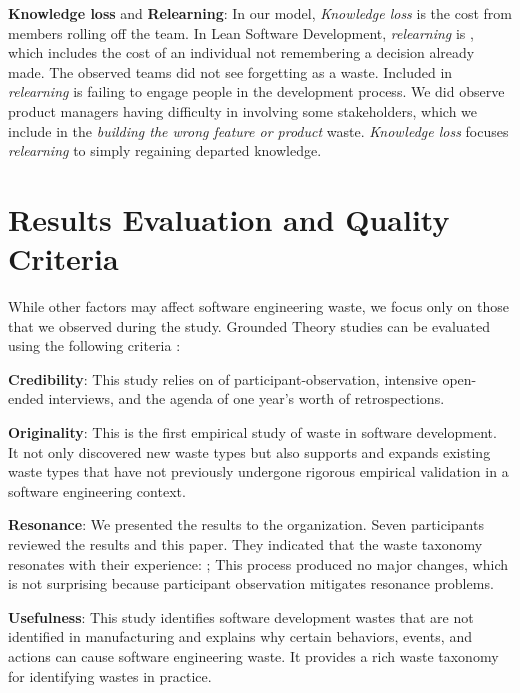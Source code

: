 \textbf{Knowledge loss} and \textbf{Relearning}:
In our model, \textit{Knowledge loss} is the cost from members rolling off the team. In Lean Software Development, \textit{relearning} is  \cite{PoppendieckConceptToCash}, which includes the cost of an individual not remembering a decision already made. The observed teams did not see forgetting as a waste.  Included in \textit{relearning} is failing to engage people in the development process. We did observe product managers having difficulty in involving some stakeholders, which we include in the \textit{building the wrong feature or product} waste. \textit{Knowledge loss} focuses \textit{relearning} to simply regaining departed knowledge. 
\section{Results Evaluation and Quality Criteria}
\label{ResultsEvaluation}
While other factors may affect software engineering waste, we focus only on those that we observed during the study. Grounded Theory studies can be evaluated using the following criteria \cite{Charmaz, StolGroundedTheory}:

\textbf{Credibility}:   This study relies on \durationOfResearchStudyPlural{} of participant-observation, \numberOfInterviews{} intensive open-ended interviews, and the agenda of one year's worth of retrospections. 

\textbf{Originality}:   This is the first empirical study of waste in software development. It not only discovered new waste types but also supports and expands existing waste types that have not previously undergone rigorous empirical validation in a software engineering context. 

\textbf{Resonance}:  We presented the results to the organization. Seven participants reviewed the results and this paper. They indicated that the waste taxonomy resonates with their experience: ;  This process produced no major changes, which is not surprising because participant observation mitigates resonance problems.

\textbf{Usefulness}:  This study identifies software development wastes that are not identified in manufacturing and explains why certain behaviors, events, and actions can cause software engineering waste. It provides a rich waste taxonomy for identifying wastes in practice. %


